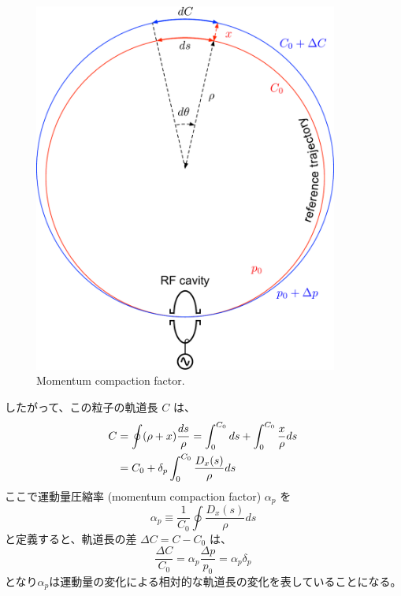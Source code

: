 \documentclass[10pt,a4paper]{ltjsarticle}
\begin{document}
\begin{figure}[hbt]
  \begin{center}
    \includegraphics[width=10cm,clip]{momentum_compaction.pdf}
    \caption{Momentum compaction factor.}
    \label{momentum_compaction}
  \end{center}
\end{figure}
%
したがって、この粒子の軌道長 $C$ は、
%
\begin{align}
  C &= \oint (\rho + x)\frac{ds}{\rho} = \int_0^{C_0} ds + \int_0^{C_0}\frac{x}{\rho} ds \notag \\
  &= C_0 + \delta_p \int_0^{C_0}\frac{D_x(s)}{\rho} ds
\end{align}
%
ここで運動量圧縮率 (momentum compaction factor) $\alpha_p$ を
%
\begin{equation}
  \alpha_p \equiv \frac{1}{C_0} \oint \frac{D_x(s)}{\rho} ds
\end{equation}
%
と定義すると、軌道長の差 $\Delta C = C-C_0$ は、
%
\begin{equation}
  \frac{\Delta C}{C_0}=\alpha_p\frac{\Delta p}{p_0}=\alpha_p\delta_p
  \label{delta_C}
\end{equation}
%
となり$\alpha_p$は運動量の変化による相対的な軌道長の変化を表していることになる。
\end{document}
